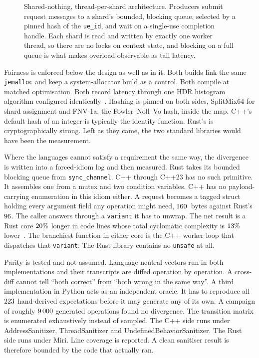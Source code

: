 \documentclass[english,twoside,openright,a4paper,censored,csm,software-track-2020]{HYthesisML}
\begin{document}
\begin{figure}[ht]
\caption[Shared-nothing, thread-per-shard architecture]{Shared-nothing, thread-per-shard architecture. Producers submit request messages to a
shard's bounded, blocking queue, selected by a pinned hash of the \texttt{ue\_id}, and wait
on a single-use completion handle. Each shard is read and written by exactly one worker
thread, so there are no locks on context state, and blocking on a full queue is what makes
overload observable as tail latency.\label{fig:arch}}
\end{figure}

Fairness is enforced below the design as well as in it. Both builds link the same
\texttt{jemalloc} and keep a system-allocator build as a control. Both compile at
matched optimisation. Both record latency through one HDR histogram algorithm configured
identically~\cite{tene_hdrhistogram}. Hashing is pinned on both sides, SplitMix64 for
shard assignment and FNV-1a, the Fowler--Noll--Vo hash, inside the map. C++'s default hash of an integer is typically
the identity function. Rust's is cryptographically strong. Left as they came, the two
standard libraries would have been the measurement.

Where the languages cannot satisfy a requirement the same way, the divergence is written
into a forced-idiom log and then measured. Rust takes its bounded blocking queue from
\texttt{sync\_channel}. C++ through C++23 has no such primitive. It assembles one from a
mutex and two condition variables. C++ has no payload-carrying enumeration in this idiom
either. A request becomes a tagged struct holding every argument field any operation might
need, $160$~bytes against Rust's $96$. The caller answers
through a \texttt{variant} it has to unwrap. The net result is a Rust core
$20\%$ longer in code lines whose total cyclomatic complexity is
$13\%$ lower~\cite{lizard}. The branchiest function in either core is the C++
worker loop that dispatches that \texttt{variant}. The Rust library contains no
\texttt{unsafe} at all.

Parity is tested and not assumed. Language-neutral vectors run in both implementations
and their transcripts are diffed operation by operation. A cross-diff cannot tell
``both correct'' from ``both wrong in the same way''. A third implementation in Python
acts as an independent oracle. It has to reproduce all $223$ hand-derived
expectations before it may generate any of its own. A campaign of roughly $9\,000$
generated operations found no divergence. The transition matrix is enumerated
exhaustively instead of sampled. The C++ side runs under AddressSanitizer,
ThreadSanitizer and UndefinedBehaviorSanitizer. The Rust side runs under Miri. Line
coverage is reported. A clean sanitiser result is therefore bounded by the code that
actually ran.
\end{document}
